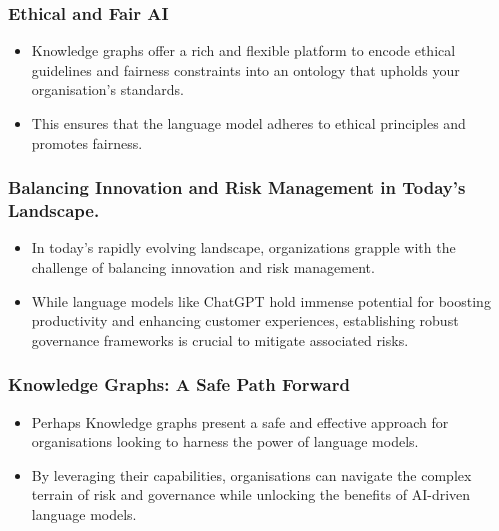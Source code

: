 \begin{frame}[fragile]\frametitle{Ethical and Fair AI}
\begin{itemize}
\item Knowledge graphs offer a rich and flexible platform to encode ethical guidelines and fairness constraints into an ontology that upholds your organisation's standards.
\item This ensures that the language model adheres to ethical principles and promotes fairness.
\end{itemize}
\end{frame}

\begin{frame}[fragile]\frametitle{Balancing Innovation and Risk Management in Today's Landscape.}
\begin{itemize}
\item In today's rapidly evolving landscape, organizations grapple with the challenge of balancing innovation and risk management. 
\item While language models like ChatGPT hold immense potential for boosting productivity and enhancing customer experiences, establishing robust governance frameworks is crucial to mitigate associated risks.
\end{itemize}
\end{frame}

\begin{frame}[fragile]\frametitle{Knowledge Graphs: A Safe Path Forward}
\begin{itemize}
\item Perhaps Knowledge graphs present a safe and effective approach for organisations looking to harness the power of language models.
\item By leveraging their capabilities, organisations can navigate the complex terrain of risk and governance while unlocking the benefits of AI-driven language models.
\end{itemize}
\end{frame}

